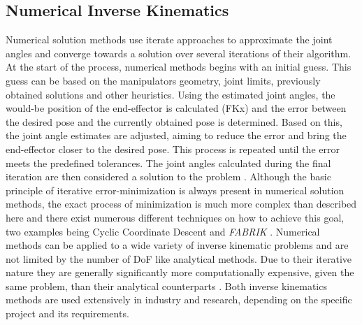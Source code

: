\subsection{Numerical Inverse Kinematics}
Numerical solution methods use iterate approaches to approximate the joint angles and converge towards a solution over several iterations of their algorithm.
At the start of the process, numerical methods begins with an initial guess.
This guess can be based on the manipulators geometry, joint limits, previously obtained solutions and other heuristics.
Using the estimated joint angles, the would-be position of the end-effector is calculated (FKx) and the error between the desired pose and the currently obtained pose is determined.
Based on this, the joint angle estimates are adjusted, aiming to reduce the error and bring the end-effector closer to the desired pose.
This process is repeated until the error meets the predefined tolerances.
The joint angles calculated during the final iteration are then considered a solution to the problem \parencite{inverseKinematicsIllinois}.
Although the basic principle of iterative error-minimization is always present in numerical solution methods, the exact process of minimization is much more complex than described here and there exist numerous different techniques on how to achieve this goal, two examples being Cyclic Coordinate Descent \parencite{inverseKinematicsIllinois} and \textit{FABRIK} \parencite{AristidouFABRIK}. 
Numerical methods can be applied to a wide variety of inverse kinematic problems and are not limited by the number of DoF like analytical methods.
Due to their iterative nature they are generally significantly more computationally expensive, given the same problem, than their analytical counterparts \parencite{aristidou2018inverse}.
Both inverse kinematics methods are used extensively in industry and research, depending on the specific project and its requirements.


